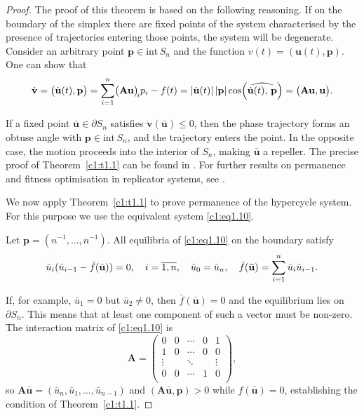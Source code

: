 \documentclass[12pt]{report}
\newcommand{\inside}{\mathrm{int}\,}
\newcommand{\bound}{\partial}
\theoremstyle{definition}
\theoremstyle{remark}
\begin{document}
\begin{proof}
The proof of this theorem is based on the following reasoning.
If on the boundary of the simplex there are fixed points of the system
characterised by the presence of trajectories entering those points,
the system will be degenerate.  Consider an arbitrary point
$\mathbf{p}\in\inside S_{n}$ and the function
$v(t)=(\mathbf{u}(t),\mathbf{p})$.  One can show that 
\begin{equation*}
	\dot{\mathbf v} = \bigl(\dot{\mathbf{u}}(t), \mathbf{p}\bigr)
	= \sum_{i=1}^{n} \bigl(\mathbf{Au}\bigr)_{\!i} p_{i} - f(t)
	= \lvert\dot{\mathbf{u}}(t)\rvert\,\lvert\mathbf{p}\rvert
	\cos\Bigl(\widehat{\dot{\mathbf{u}}(t),\, \mathbf{p}}\Bigr)
	 = \bigl(\mathbf{Au}, \mathbf{u}\bigr).
\end{equation*}

If a fixed point $\bar{\mathbf{u}}\in\bound S_{n}$ satisfies
$\dot{\mathbf v}(\bar{\mathbf{u}})\leqslant 0$, then the phase trajectory
forms an obtuse angle with $\mathbf{p}\in\inside S_{n}$, and
the trajectory enters the point.  In the opposite case, the motion
proceeds into the interior of $S_{n}$, making $\bar{\mathbf{u}}$
a repeller.
The precise proof of Theorem~\ref{c1:t1.1} can be found in
\cite{c1:Hofbauer2003}. For further results on permanence and fitness optimisation in replicator systems, see \cite{c1:Drozhzhin2021}.

We now apply Theorem~\ref{c1:t1.1} to prove permanence of the hypercycle
system.  For this purpose we use the equivalent system \eqref{c1:eq1.10}.

Let $\mathbf{p}=(n^{-1},\ldots,n^{-1})$.  All equilibria of
\eqref{c1:eq1.10} on the boundary satisfy
$$\bar{u}_{i}(\bar{u}_{i-1}-\bar{f}(\bar{\mathbf{u}}))=0, \quad i = \overline{1, n}, \quad \bar{u}_{0} = \bar{u}_{n}, 
\quad \bar{f}({\bf \bar{u}}) = \sum\limits_{i = 1}^{n}\bar{u}_{i}\bar{u}_{i - 1}.
$$

If, for example, $\bar{u}_{1}=0$ but $\bar{u}_{2}\neq 0$, then
$\bar{f}(\bar{\mathbf{u}})=0$ and the equilibrium lies on
$\bound S_{n}$.  
This means that at least one component of such a vector must be
non-zero. The interaction matrix of \eqref{c1:eq1.10} is
\[
  \mathbf{A}=
  \begin{pmatrix}
    0 & 0 & \cdots & 0 & 1\\
    1 & 0 & \cdots & 0 & 0\\
    \vdots &   &  \ddots& & \vdots\\
    0 & 0 & \cdots & 1 & 0\\
  \end{pmatrix},
\]
so $\mathbf{A\bar{u}}=(\bar{u}_{n},\bar{u}_{1},\ldots,\bar{u}_{n-1})$
and $(\mathbf{A\bar{u}},\mathbf{p})>0$ while $f(\bar{\mathbf{u}})=0$,
establishing the condition of Theorem~\ref{c1:t1.1}.
\end{proof}
\end{document}
